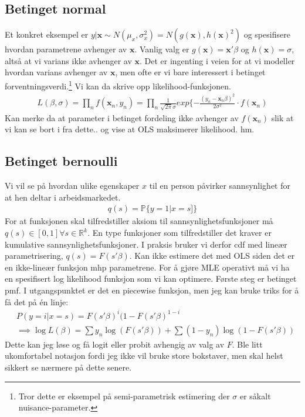 \subsection{Betinget normal}
Et konkret eksempel er $y|\mathbf{x} \sim N(\mu_x,\sigma_x^2) = N(g(\mathbf{x}),h(\mathbf{x})^2)$ og spesifisere hvordan parametrene avhenger av $\mathbf{x}$. Vanlig valg er $g(\mathbf{x})=\mathbf{x}'\beta$ og $h(\mathbf{x})=\sigma$, altså at vi varians ikke avhenger av $\mathbf{x}$. Det er ingenting i veien for at vi modeller hvordan varians avhenger av $\mathbf{x}$, men ofte er vi bare interessert i betinget forventningsverdi.\footnote{Tror dette er eksempel på semi-parametrisk estimering der $\sigma$ er såkalt nuisance-parameter.} Vi kan da skrive opp likelihood-funksjonen.
\begin{align}
L(\beta,\sigma) = \prod_n f(\mathbf{x}_n,y_n) = \prod_n \frac{1}{\sqrt{2\pi}\sigma}exp\{-\frac{(y_n-\mathbf{x}_n\beta)^2}{2\sigma^2} \cdot f(\mathbf{x}_n)
\end{align}
Kan merke da at parameter i betinget fordeling ikke avhenger av $f(\mathbf{x}_n)$ slik at vi kan se bort i fra dette.. og vise at OLS maksimerer likelihood. hm.
\subsection{Betinget bernoulli}
Vi vil se på hvordan ulike egenskaper $x$ til en person påvirker sannsynlighet for at hen deltar i arbeidsmarkedet. 
\begin{align}
q(s)=\mathbb{P}\{y=1|x=s]\}
\end{align}
For at funksjonen skal tilfredstiller aksiom til sannsynlighetsfunksjoner må $q(s) \in [0,1] \forall s \in \mathbb{R}^k$. En type funksjoner som tilfredstiller det kraver er kumulative sannsynlighetsfunksjoner. I praksis bruker vi derfor cdf med lineær parametrisering, $q(s)=F(s'\beta)$. Kan ikke estimere det med OLS siden det er en ikke-lineær funksjon mhp parametrene. For å gjøre MLE operativt må vi ha en spesifisert log likelihood funksjon som vi kan optimere. Første steg er betinget pmf. I utgangspunktet er det en piecewise funksjon, men jeg kan bruke triks for å få det på én linje:
\begin{align}
&P(y=i|x=s)=F(s'\beta)^i(1-F(s'\beta)^{1-i} \\
&\implies  \log L(\beta) = \sum y_n \log(F(s'\beta)) + \sum (1-y_n) \log (1-F(s'\beta))
\end{align}
Dette kan jeg løse og få logit eller probit avhengig av valg av $F$. Ble litt ukomfortabel notasjon fordi jeg ikke vil bruke store bokstaver, men skal helst sikkert se nærmere på dette senere. 
